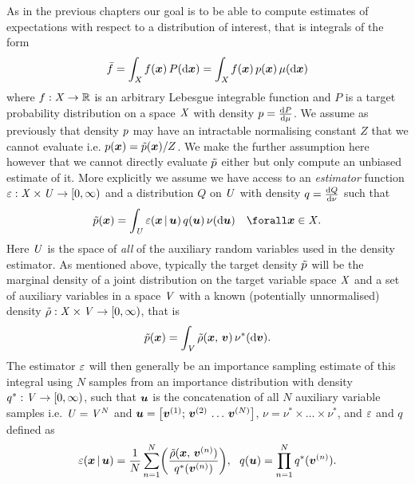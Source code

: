 As in the previous chapters our goal is to be able to compute estimates of expectations with respect to a distribution of interest, that is integrals of the form
\begin{equation}
  \bar{f} = \int_{\mathit{X}} f(\boldsymbol{x})\,P(\mathrm{d} \boldsymbol{x}) = \int_{\mathit{X}} f(\boldsymbol{x})\,p(\boldsymbol{x})\,\mu(\mathrm{d}\boldsymbol{x})
\end{equation}
where $f : \mathit{X} \to \mathbb{R}$ is an arbitrary Lebesgue integrable function and $P$ is a target probability distribution on a space $\mathit{X}$ with density $p = \frac{\mathrm{d} P}{\mathrm{d} \mu}$. We assume as previously that density $p$ may have an intractable normalising constant $Z$ that we cannot evaluate i.e. $p(\boldsymbol{x}) = \tilde{p}(\boldsymbol{x}) / Z$. We make the further assumption here however that we cannot directly evaluate $\tilde{p}$ either but only compute an unbiased estimate of it. More explicitly we assume we have access to an \emph{estimator} function $\varepsilon : \mathit{X} \times \mathit{U} \to [0,\infty)$ and a distribution $Q$ on $\mathit{U}$ with density $q = \frac{\mathrm{d} Q}{\mathrm{d} \nu}$ such that
\begin{equation}\label{eq:density-unbiased-estimator-property}
  \utgtdens(\vct{x}) = \int_{\set{U}} \esttgtdens(\vct{x}\gvn\vct{u})\,q(\vct{u})\,\nu(\dr\vct{u})
  \quad \forall \vct{x} \in \set{X}.
\end{equation}
Here $\mathit{U}$ is the space of \emph{all} of the auxiliary random variables used in the density estimator. As mentioned above, typically the target density $\tilde{p}$ will be the marginal density of a joint distribution on the target variable space $\mathit{X}$ and a set of auxiliary variables in a space $\mathit{V}$ with a known (potentially unnormalised) density $\tilde{\rho} : \mathit{X} \times \mathit{V} \to [0,\infty)$, that is
\begin{equation}\label{eq:target-density-marginal}
  \tilde{p}(\boldsymbol{x}) = \int_{\mathit{V}} \tilde{\rho}(\boldsymbol{x},\,\boldsymbol{v}) \,\nu^*(\mathrm{d}\boldsymbol{v}).
\end{equation}
The estimator $\varepsilon$ will then generally be an importance sampling estimate of this integral using $N$ samples from an importance distribution with density $q^* : \mathit{V} \to [0,\infty)$, such that $\boldsymbol{u}$ is the concatenation of all $N$ auxiliary variable samples i.e. $\mathit{U} = \mathit{V}^N$ and $\vct{u} = \lsb \vct{v}^{(1)};\,\vct{v}^{(2)}\,\dots\,\vct{v}^{(N)}\rsb$, $\nu = \nu^* \times \dots \times \nu^*$, and $\varepsilon$ and $q$ defined as
\begin{equation}\label{eq:target-density-importance-sampling-estimator}
  \esttgtdens(\vct{x}\gvn\vct{u}) = 
  	\frac{1}{N}\sum_{n=1}^N\lpa
  	  \frac{\tilde{\rho}(\vct{x},\,\vct{v}^{(n)})}{q^*(\vct{v}^{(n)})}
    \rpa,
   ~~
   q(\vct{u}) = \prod_{n=1}^N q^*(\vct{v}^{(n)}).
\end{equation}
